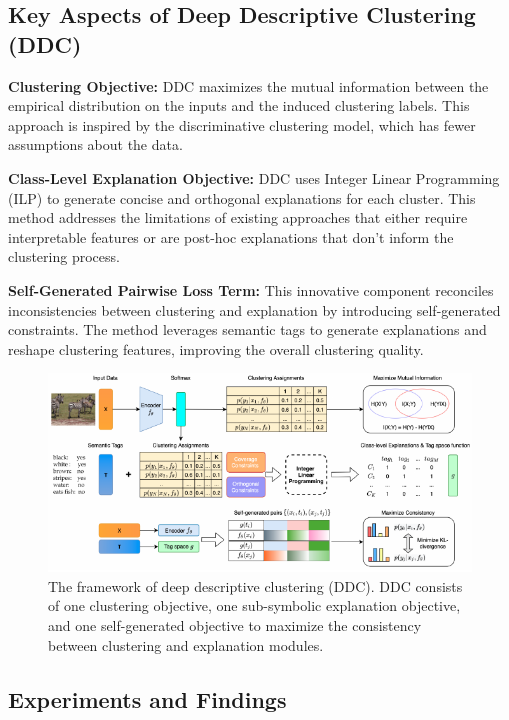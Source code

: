 \subsection{Key Aspects of Deep Descriptive Clustering (DDC)}

\textbf{Clustering Objective:} DDC maximizes the mutual information between the empirical distribution on the inputs and the induced clustering labels. This approach is inspired by the discriminative clustering model, which has fewer assumptions about the data.

\textbf{Class-Level Explanation Objective:} DDC uses Integer Linear Programming (ILP) to generate concise and orthogonal explanations for each cluster. This method addresses the limitations of existing approaches that either require interpretable features or are post-hoc explanations that don't inform the clustering process.

\textbf{Self-Generated Pairwise Loss Term:} This innovative component reconciles inconsistencies between clustering and explanation by introducing self-generated constraints. The method leverages semantic tags to generate explanations and reshape clustering features, improving the overall clustering quality.

\begin{figure}
\centering
\includegraphics[width=1\textwidth]{figs/dec.png}
    \caption{The framework of deep descriptive clustering (DDC). DDC consists of one clustering objective, one sub-symbolic explanation objective, and one self-generated objective to maximize the consistency between clustering and explanation modules.}
\label{fig:ddc}
\end{figure}

\subsection{Experiments and Findings}

